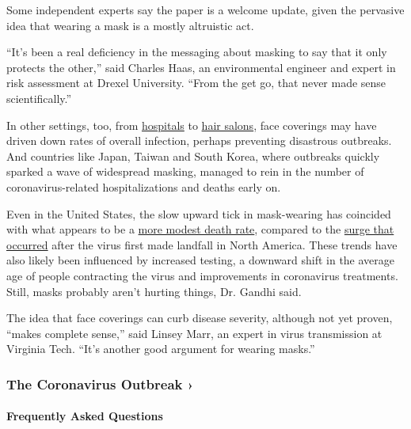Some independent experts say the paper is a welcome update, given the
pervasive idea that wearing a mask is a mostly altruistic act.

``It's been a real deficiency in the messaging about masking to say that
it only protects the other,'' said Charles Haas, an environmental
engineer and expert in risk assessment at Drexel University. ``From the
get go, that never made sense scientifically.''

In other settings, too, from
\href{https://jamanetwork.com/journals/jama/fullarticle/2768533}{hospitals}
to
\href{https://www.nytimes3xbfgragh.onion/2020/07/14/health/coronavirus-hair-salon-masks.html}{hair
salons}, face coverings may have driven down rates of overall infection,
perhaps preventing disastrous outbreaks. And countries like Japan,
Taiwan and South Korea, where outbreaks quickly sparked a wave of
widespread masking, managed to rein in the number of coronavirus-related
hospitalizations and deaths early on.

Even in the United States, the slow upward tick in mask-wearing has
coincided with what appears to be a
\href{https://www.nytimes3xbfgragh.onion/2020/07/03/health/coronavirus-mortality-testing.html}{more
modest death rate}, compared to the
\href{https://www.nytimes3xbfgragh.onion/interactive/2020/us/coronavirus-us-cases.html}{surge
that occurred} after the virus first made landfall in North America.
These trends have also likely been influenced by increased testing, a
downward shift in the average age of people contracting the virus and
improvements in coronavirus treatments. Still, masks probably aren't
hurting things, Dr. Gandhi said.

The idea that face coverings can curb disease severity, although not yet
proven, ``makes complete sense,'' said Linsey Marr, an expert in virus
transmission at Virginia Tech. ``It's another good argument for wearing
masks.''

\href{https://www.nytimes3xbfgragh.onion/news-event/coronavirus?action=click\&pgtype=Article\&state=default\&region=MAIN_CONTENT_3\&context=storylines_faq}{}

\hypertarget{the-coronavirus-outbreak-}{%
\subsubsection{The Coronavirus Outbreak
›}\label{the-coronavirus-outbreak-}}

\hypertarget{frequently-asked-questions}{%
\paragraph{Frequently Asked
Questions}\label{frequently-asked-questions}}

